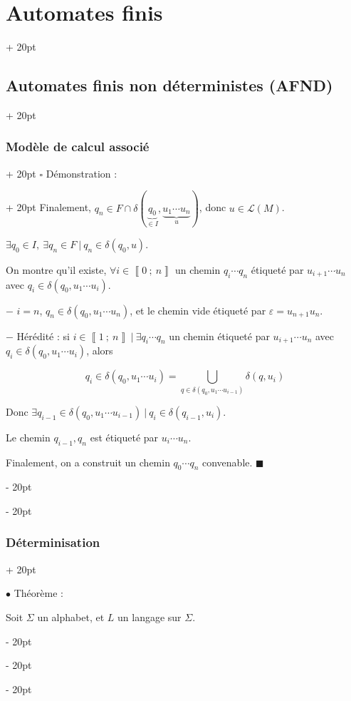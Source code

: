 \documentclass[a4paper, 12pt, twoside]{article}
\newcommand{\nset}[2]{\left\llbracket #1\ ;\ #2 \right\rrbracket}
\newcommand{\ind}[1][20pt]{\advance\leftskip + #1}
\newcommand{\deind}[1][20pt]{\advance\leftskip - #1}
\newenvironment{indt}[2][20pt]{#2 \par \ind[#1]}{\par \deind} %
\newenvironment{proof}[1][{Démonstration :}]{\begin{indt}{$\square$ #1}}{$\blacksquare$ \end{indt}}
\begin{document}
\begin{indt}{\section{Automates finis}}
\begin{indt}{\subsection{Automates finis non déterministes (AFND)}}
\begin{indt}{\subsubsection{Modèle de calcul associé}}
\begin{proof}
                    Finalement, $q_n \in F \cap \delta(\underbrace{q_0}_{\in I}, \underbrace{u_1 \cdots u_n}_u)$, donc $u \in \mathcal L(M)$.

                    \vspace{12pt}
                    
                    \boxed{\Rightarrow} $\exists q_0 \in I,\ \exists q_n \in F\ |\ q_n \in \delta(q_0, u)$.

                    On montre qu'il existe, $\forall i \in \nset 0 n$ un chemin $q_i \cdots q_n$ étiqueté par $u_{i + 1} \cdots u_n$ avec $q_i \in \delta(q_0, u_1 \cdots u_i)$.

                    \vspace{6pt}
                    
                    $-$ $i = n$, $q_n \in \delta(q_0, u_1 \cdots u_n)$, et le chemin vide étiqueté par $\varepsilon = u_{n + 1}u_n$.

                    \vspace{6pt}
                    
                    $-$ Hérédité : si $i \in \nset 1 n\ |\ \exists q_i \cdots q_n$ un chemin étiqueté par $u_{i + 1} \cdots u_n$ avec $q_i \in \delta(q_0, u_1 \cdots u_i)$, alors

                    \[
                        q_i \in \delta(q_0, u_1 \cdots u_i) = \bigcup_{q \in \delta(q_0, u_1 \cdots u_{i - 1})} \delta(q, u_i)
                    \]

                    Donc $\exists q_{i - 1} \in \delta(q_0, u_1 \cdots u_{i - 1})\ |\ q_i \in \delta(q_{i - 1}, u_i)$.

                    Le chemin $q_{i - 1}, q_n$ est étiqueté par $u_{i} \cdots u_n$.

                    Finalement, on a construit un chemin $q_0 \cdots q_n$ convenable.
                \end{proof}
            \end{indt}

            \vspace{12pt}
            
            \begin{indt}{\subsubsection{Déterminisation}}
                \label{2.2.4}

                $\bullet$ Théorème :
                \begin{emphBox}
                    Soit $\Sigma$ un alphabet, et $L$ un langage sur $\Sigma$.


\end{emphBox}
\end{indt}
\end{indt}
\end{indt}
\end{document}
